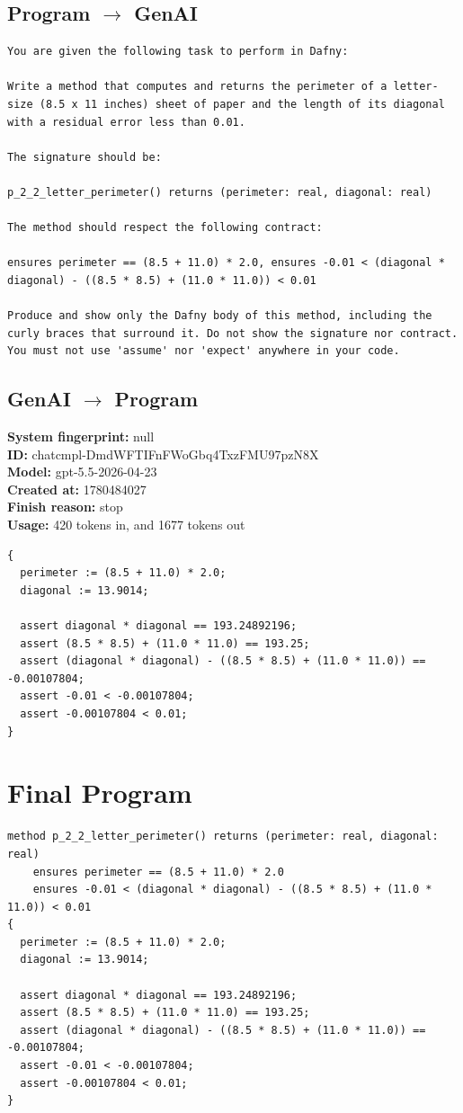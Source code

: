 \documentclass{article}
\begin{document}
\subsection*{Program $\rightarrow$ GenAI}
\begin{lstlisting}
You are given the following task to perform in Dafny:

Write a method that computes and returns the perimeter of a letter-size (8.5 x 11 inches) sheet of paper and the length of its diagonal with a residual error less than 0.01.

The signature should be:

p_2_2_letter_perimeter() returns (perimeter: real, diagonal: real)

The method should respect the following contract:

ensures perimeter == (8.5 + 11.0) * 2.0, ensures -0.01 < (diagonal * diagonal) - ((8.5 * 8.5) + (11.0 * 11.0)) < 0.01

Produce and show only the Dafny body of this method, including the curly braces that surround it. Do not show the signature nor contract. You must not use 'assume' nor 'expect' anywhere in your code.
\end{lstlisting}
\subsection*{GenAI $\rightarrow$ Program}
\textbf{System fingerprint: }null
\\\textbf{ID: }chatcmpl-DmdWFTIFnFWoGbq4TxzFMU97pzN8X
\\\textbf{Model: }gpt-5.5-2026-04-23
\\\textbf{Created at: }1780484027
\\\textbf{Finish reason: }stop
\\\textbf{Usage: }420 tokens in, and 1677 tokens out
\begin{lstlisting}
{
  perimeter := (8.5 + 11.0) * 2.0;
  diagonal := 13.9014;

  assert diagonal * diagonal == 193.24892196;
  assert (8.5 * 8.5) + (11.0 * 11.0) == 193.25;
  assert (diagonal * diagonal) - ((8.5 * 8.5) + (11.0 * 11.0)) == -0.00107804;
  assert -0.01 < -0.00107804;
  assert -0.00107804 < 0.01;
}
\end{lstlisting}
\section*{Final Program}
\begin{lstlisting}
method p_2_2_letter_perimeter() returns (perimeter: real, diagonal: real)
	ensures perimeter == (8.5 + 11.0) * 2.0
	ensures -0.01 < (diagonal * diagonal) - ((8.5 * 8.5) + (11.0 * 11.0)) < 0.01
{
  perimeter := (8.5 + 11.0) * 2.0;
  diagonal := 13.9014;

  assert diagonal * diagonal == 193.24892196;
  assert (8.5 * 8.5) + (11.0 * 11.0) == 193.25;
  assert (diagonal * diagonal) - ((8.5 * 8.5) + (11.0 * 11.0)) == -0.00107804;
  assert -0.01 < -0.00107804;
  assert -0.00107804 < 0.01;
}
\end{lstlisting}
\end{document}
